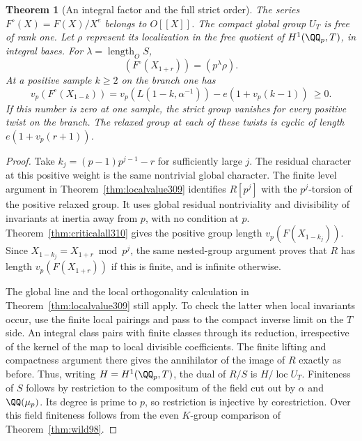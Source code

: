 \documentclass[a4paper,11pt]{article}
\newtheorem{theorem}[proposition]{Theorem}
\theoremstyle{definition}
\theoremstyle{remark}
\numberwithin{equation}{section}
\begin{document}
\begin{theorem}[An integral factor and the full strict order]\leavevmode
\label{thm:forced310}
The series \(F^\circ(X)=F(X)/X^e\) belongs to \(O[[X]]\).
The compact global group \(U_T\) is free of rank one. Let
\(\rho\) represent its localization in the free quotient of
\(H^1(\QQ_p,T)\), in integral bases. For
\(\lambda=\operatorname{length}_O S\),
\[
    (F^\circ(X_{1+r}))=(p^\lambda\rho).
\]
At a positive sample \(k\ge2\) on the branch one has
\[
 v_p(F^\circ(X_{1-k}))
      =v_p(L(1-k,\alpha^{-1}))-e(1+v_p(k-1))\ \ge0 .
\]
If this number is zero at one sample, the strict group vanishes
for every positive twist on the branch. The relaxed group at
each of these twists is cyclic of length \(e(1+v_p(r+1))\).
\end{theorem}
\begin{proof}
Take \(k_j=(p-1)p^{j-1}-r\) for sufficiently large \(j\).
The residual character at this positive weight is the same
nontrivial global character. The finite level argument in
Theorem~\ref{thm:localvalue309} identifies \(R[p^j]\) with
the \(p^j\)-torsion of the positive relaxed group. It uses
global residual nontriviality and divisibility of invariants at
inertia away from \(p\), with no condition at \(p\).
Theorem~\ref{thm:criticalall310} gives the positive group length
\(v_p(F(X_{1-k_j}))\). Since \(X_{1-k_j}=X_{1+r}\bmod p^j\),
the same nested-group argument proves that \(R\) has length
\(v_p(F(X_{1+r}))\) if this is finite, and is infinite otherwise.

The global line and the local orthogonality calculation in
Theorem~\ref{thm:localvalue309} still apply. To check the latter
when local invariants occur, use the finite local pairings and
pass to the compact inverse limit on the \(T\) side.
An integral class pairs with finite classes through its reduction,
irrespective of the kernel of the map to local divisible
coefficients. The finite lifting and compactness argument there
gives the annihilator of the image of \(R\) exactly as before.
Thus, writing \(H=H^1(\QQ_p,T)\), the dual of \(R/S\) is
\(H/\operatorname{loc} U_T\). Finiteness of \(S\) follows by
restriction to the compositum of the field cut out by \(\alpha\)
and \(\QQ(\mu_p)\). Its degree is prime to \(p\), so restriction is
injective by corestriction. Over this field finiteness follows
from the even \(K\)-group comparison of Theorem~\ref{thm:wild98}.


\end{proof}
\end{document}
